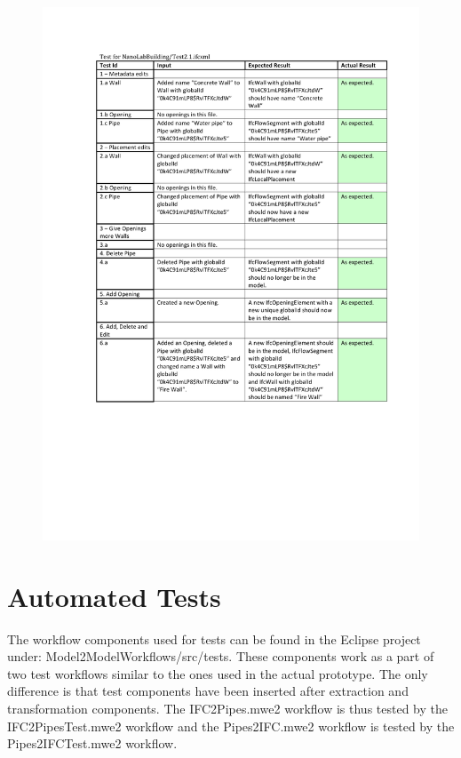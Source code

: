 \begin{figure}[ht]
    \centering
        \centerline{\includegraphics[width=150mm]{images/Test4.pdf}}
    \caption{}
    \label{fig:test4}
\end{figure}


\section{Automated Tests}
\label{app:automatedtests}
The workflow components used for tests can be found in the Eclipse project under: Model2ModelWorkflows/src/tests. These components work as a part of two test workflows similar to the ones used in the actual prototype. The only difference is that test components have been inserted after extraction and transformation components. The IFC2Pipes.mwe2 workflow is thus tested by the IFC2PipesTest.mwe2 workflow and the Pipes2IFC.mwe2 workflow is tested by the Pipes2IFCTest.mwe2 workflow.

